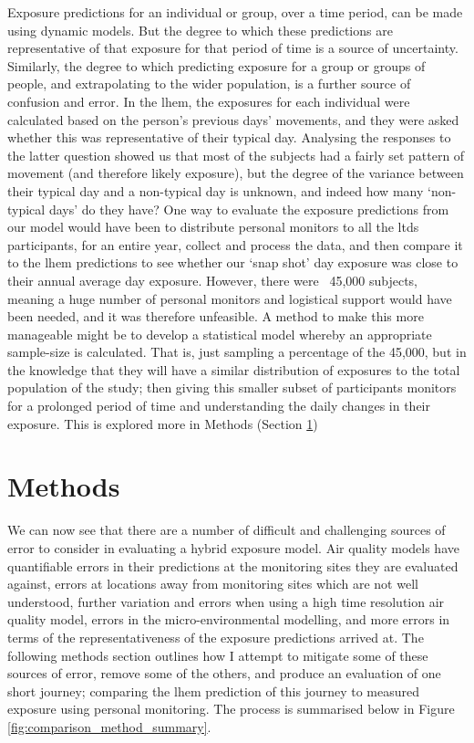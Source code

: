 Exposure predictions for an individual or group, over a time period, can be made using dynamic models. But the degree to which these predictions are representative of that exposure for that period of time is a source of uncertainty. Similarly, the degree to which predicting exposure for a group or groups of people, and extrapolating to the wider population, is a further source of confusion and error. In the \gls{lhem}, the exposures for each individual were calculated based on the person’s previous days’ movements, and they were asked whether this was representative of their typical day. Analysing the responses to the latter question showed us that most of the subjects had a fairly set pattern of movement (and therefore likely exposure), but the degree of the variance between their typical day and a non-typical day is unknown, and indeed how many ‘non-typical days’ do they have? One way to evaluate the exposure predictions from our model would have been to distribute personal monitors to all the \gls{ltds} participants, for an entire year, collect and process the data, and then compare it to the \gls{lhem} predictions to see whether our ‘snap shot’ day exposure was close to their annual average day exposure. However, there were ~45,000 subjects, meaning a huge number of personal monitors and logistical support would have been needed, and it was therefore unfeasible. A method to make this more manageable might be to develop a statistical model whereby an appropriate sample-size is calculated. That is, just sampling a percentage of the 45,000, but in the knowledge that they will have a similar distribution of exposures to the total population of the study; then giving this smaller subset of participants monitors for a prolonged period of time and understanding the daily changes in their exposure. This is explored more in Methods (Section \ref{sec:4methods}) 

\section{Methods}
\label{sec:4methods}

We can now see that there are a number of difficult and challenging sources of error to consider in evaluating a hybrid exposure model. Air quality models have quantifiable errors in their predictions at the monitoring sites they are evaluated against, errors at locations away from monitoring sites which are not well understood, further variation and errors when using a high time resolution air quality model, errors in the micro-environmental modelling, and more errors in terms of the representativeness of the exposure predictions arrived at. The following methods section outlines how I attempt to mitigate some of these sources of error, remove some of the others, and produce an evaluation of one short journey; comparing the \gls{lhem} prediction of this journey to measured exposure using personal monitoring. The process is summarised below in Figure \ref{fig:comparison_method_summary}.

